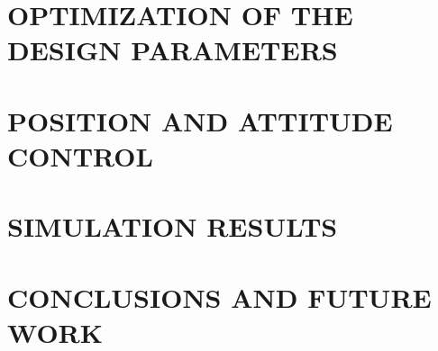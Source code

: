 \documentclass[letterpaper, 10 pt, conference]{ieeeconf}  %
\begin{document}
\section{OPTIMIZATION OF THE DESIGN PARAMETERS}
\label{sec:design-parameters}


\section{POSITION AND ATTITUDE CONTROL}
\label{sec:posit-attit-contr}


\section{SIMULATION RESULTS}
\label{sec:prel-valid}


\section{CONCLUSIONS AND FUTURE WORK}
\label{sec:concl-future-work}









\end{document}
